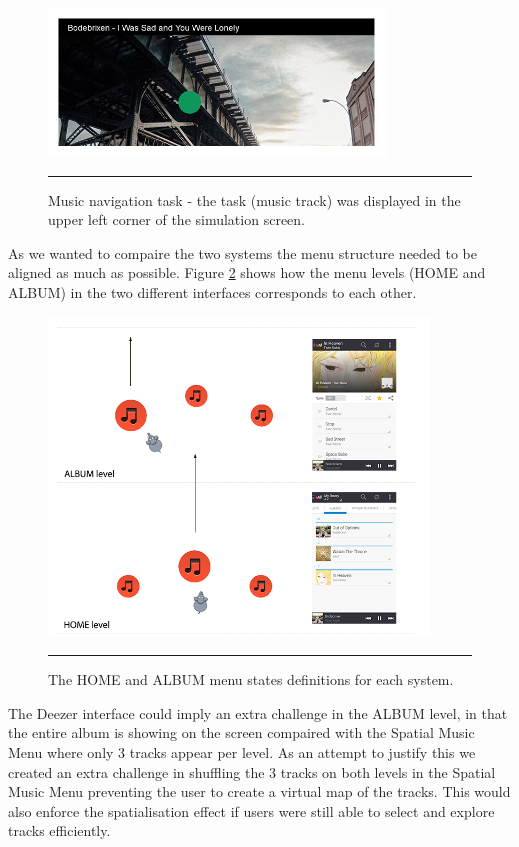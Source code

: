 \begin{figure}[t]
	\centering
		\includegraphics[width=0.8\textwidth,height=\textheight,keepaspectratio]{./Figures/simulation_musictask.jpg}
		\rule{35em}{1pt}
	\caption[Music navigation task]{Music navigation task - the task (music track) was displayed in the upper left corner of the simulation screen.}
	\label{fig:simulationmusictask}
\end{figure}

As we wanted to compaire the two systems the menu structure needed to be aligned as much as possible. Figure \ref{fig:menustates} shows how the menu levels (HOME and ALBUM) in the two different interfaces corresponds to each other.

\begin{figure}[t]
	\centering
		\includegraphics[width=0.9\textwidth,height=\textheight,keepaspectratio]{./Figures/menustates.png}
		\rule{35em}{1pt}
	\caption[Menu states comparison]{The HOME and ALBUM menu states definitions for each system.}
	\label{fig:menustates}
\end{figure}

The Deezer interface could imply an extra challenge in the ALBUM level, in that the entire album is showing on the screen compaired with the Spatial Music Menu where only 3 tracks appear per level. As an attempt to justify this we created an extra challenge in shuffling the 3 tracks on both levels in the Spatial Music Menu preventing the user to create a virtual map of the tracks. This would also enforce the spatialisation effect if users were still able to select and explore tracks efficiently.

